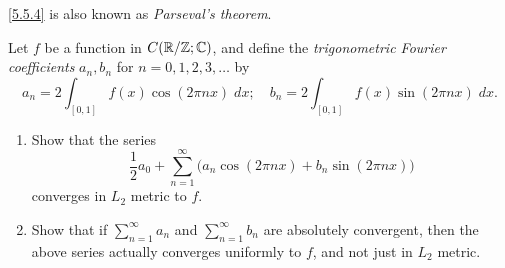 \begin{note}
  \cref{5.5.4} is also known as \emph{Parseval's theorem}.
\end{note}

\exercisesection

\begin{ex}\label{ex:5.5.1}
  Let \(f\) be a function in \(C(\mathbb{R} / \mathbb{Z} ; \mathbb{C})\), and define the \emph{trigonometric Fourier coefficients} \(a_n, b_n\) for \(n = 0, 1, 2, 3, \dots\) by
  \[
    a_n = 2 \int_{[0, 1]} f(x) \cos(2 \pi n x) \; dx; \quad b_n = 2 \int_{[0, 1]} f(x) \sin(2 \pi n x) \; dx.
  \]
  \begin{enumerate}
    \item Show that the series
          \[
            \dfrac{1}{2} a_0 + \sum_{n = 1}^\infty \big(a_n \cos(2 \pi n x) + b_n \sin(2 \pi n x)\big)
          \]
          converges in \(L_2\) metric to \(f\).
    \item Show that if \(\sum_{n = 1}^\infty a_n\) and \(\sum_{n = 1}^\infty b_n\) are absolutely convergent, then the above series actually converges uniformly to \(f\), and not just in \(L_2\) metric.
  \end{enumerate}
\end{ex}

